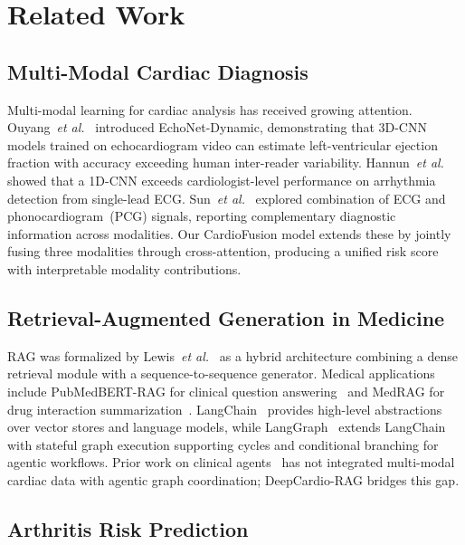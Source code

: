 \documentclass[journal,10pt,twoside]{IEEEtran}
\begin{document}
\section{Related Work}
\label{sec:related}

\subsection{Multi-Modal Cardiac Diagnosis}

Multi-modal learning for cardiac analysis has received growing attention.
Ouyang~\textit{et al.}~\cite{ouyang2020} introduced EchoNet-Dynamic, demonstrating
that 3D-CNN models trained on echocardiogram video can estimate left-ventricular
ejection fraction with accuracy exceeding human inter-reader variability.
Hannun~\textit{et al.}~\cite{hannun2019} showed that a 1D-CNN exceeds
cardiologist-level performance on arrhythmia detection from single-lead ECG.
Sun~\textit{et al.}~\cite{sun2024} explored combination of ECG and
phonocardiogram~(PCG) signals, reporting complementary diagnostic information across
modalities.
Our CardioFusion model extends these by jointly fusing three modalities through
cross-attention, producing a unified risk score with interpretable modality
contributions.

\subsection{Retrieval-Augmented Generation in Medicine}

RAG was formalized by Lewis~\textit{et al.}~\cite{lewis2020} as a hybrid
architecture combining a dense retrieval module with a sequence-to-sequence generator.
Medical applications include PubMedBERT-RAG for clinical question
answering~\cite{gu2022} and MedRAG for drug interaction
summarization~\cite{zakka2024}.
LangChain~\cite{langchain2022} provides high-level abstractions over vector stores and
language models, while LangGraph~\cite{langgraph2024} extends LangChain with stateful
graph execution supporting cycles and conditional branching for agentic workflows.
Prior work on clinical agents~\cite{mehandru2024} has not integrated multi-modal cardiac
data with agentic graph coordination; DeepCardio-RAG bridges this gap.

\subsection{Arthritis Risk Prediction}
\end{document}
